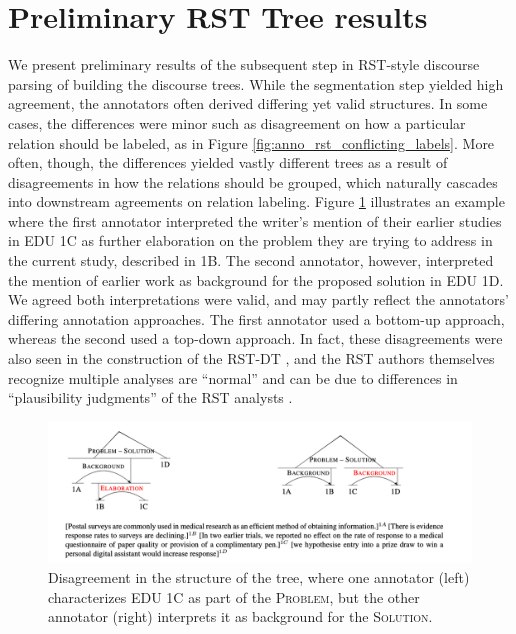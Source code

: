 \section{Preliminary RST Tree results}
We present preliminary results of the subsequent step in RST-style discourse parsing of building the discourse trees. While the segmentation step yielded high agreement, the annotators often derived differing yet valid structures. In some cases, the differences were minor such as disagreement on how a particular relation should be labeled, as in Figure \ref{fig:anno_rst_conflicting_labels}. More often, though, the differences yielded vastly different trees as a result of disagreements in how the relations should be grouped, which naturally cascades into downstream agreements on relation labeling. Figure \ref{fig:anno_rst_conflicting_trees} illustrates an example where the first annotator interpreted the writer's mention of their earlier studies in EDU 1C as further elaboration on the problem they are trying to address in the current study, described in 1B. The second annotator, however, interpreted the mention of earlier work as background for the proposed solution in EDU 1D. We agreed both interpretations were valid, and may partly reflect the annotators' differing annotation approaches. The first annotator used a bottom-up approach, whereas the second used a top-down approach. In fact, these disagreements were also seen in the construction of the RST-DT \cite{Carlson:2001}, and the RST authors themselves recognize multiple analyses are ``normal'' and can be due to differences in ``plausibility judgments'' of the RST analysts \cite{Mann:1992}. 

\begin{figure}
    \centering
    \includegraphics[scale=0.62]{plots/anno_rst_conflicting_trees.pdf}
    \caption{Disagreement in the structure of the tree, where one annotator (left) characterizes EDU 1C   as part of the \textsc{Problem}, but the other annotator (right) interprets it as background for the \textsc{Solution}.}
    \label{fig:anno_rst_conflicting_trees}
\end{figure}

